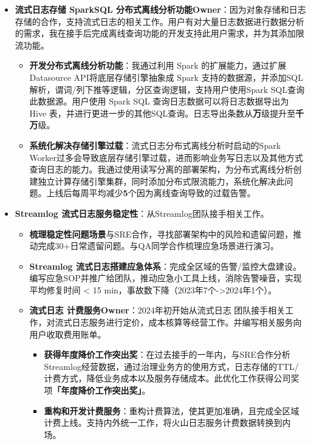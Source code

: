 \documentclass{resume}
\begin{document}
{%
    \begin{itemize}[parsep=0.5ex]
        \item \textbf{流式日志存储 SparkSQL 分布式离线分析功能Owner}：因为对象存储和日志存储的合作，支持流式日志的相关工作。用户有对大量日志数据进行数据分析的需求，我在接手后完成离线查询功能的开发支持此用户需求，并为其添加限流功能。
        \begin{itemize}[parsep=0.5ex]
            \item \textbf{开发分布式离线分析功能}：我通过利用 Spark 的扩展能力，通过扩展Datasource API将底层存储引擎抽象成 Spark 支持的数据源，并添加SQL解析，谓词/列下推等逻辑，分区查询逻辑，支持用户使用Spark SQL查询此数据源。用户使用 Spark SQL 查询日志数据可以将日志数据导出为 Hive 表，并进行更进一步的其他SQL查询。日志导出条数从\textbf{万}级提升至\textbf{千万}级。
            \item \textbf{系统化解决存储引擎过载}：流式日志分布式离线分析时启动的Spark Worker过多会导致底层存储引擎过载，进而影响业务写日志以及其他方式查询日志的能力。我通过使用读写分离的部署架构，为分布式离线分析创建独立计算存储引擎集群，同时添加分布式限流能力，系统化解决此问题。上线后每周平均减少\textbf{5}个因为离线查询导致的过载告警。
        \end{itemize}
    \end{itemize}


    \begin{itemize}[parsep=0.5ex]
    \item  \textbf{Streamlog 流式日志服务稳定性}：从Streamlog团队接手相关工作。
    \begin{itemize}[parsep=0.5ex]
        \item \textbf{梳理稳定性问题场景}与SRE合作，寻找部署架构中的风险和遗留问题，推动完成30+日常遗留问题。与QA同学合作梳理应急场景进行演习。
        \item \textbf{Streamlog 流式日志搭建应急体系}：完成全区域的告警/监控大盘建设。编写应急SOP并推广给团队，推动应急小工具上线，消除告警噪音，实现平均修复时间 < 15 min，事故数下降（2023年7个->2024年1个）。
    \end{itemize}
        
    \begin{itemize}[parsep=0.5ex]
        \item  \textbf{流式日志 计费服务Owner}：2024年初开始从流式日志 团队接手相关工作，对流式日志服务进行定价，成本核算等经营工作。并编写相关服务向用户收取费用账单。
        \begin{itemize}[parsep=0.5ex]
            \item \textbf{获得年度降价工作突出奖}：在过去接手的一年内，与SRE合作分析Streamlog经营数据，通过治理业务方的使用方式，日志存储的TTL/计费方式，降低业务成本以及服务存储成本。此优化工作获得公司奖项\textbf{「年度降价工作突出奖」}。
            \item \textbf{重构和开发计费服务}：重构计费算法，使其更加准确，且完成全区域计费上线。支持内外统一工作，将火山日志服务计费数据转换到内场。
        \end{itemize}
    \end{itemize}
\end{itemize}
}
\end{document}
